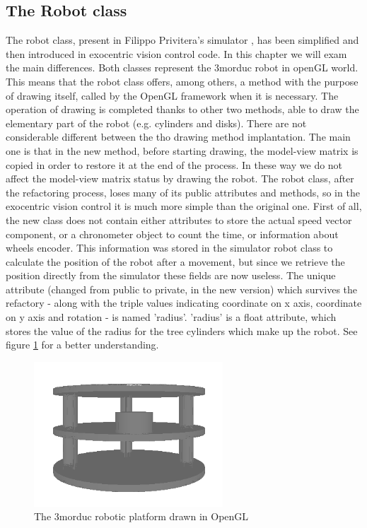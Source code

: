 \subsection{The Robot class}

The robot class, present in Filippo Privitera's simulator \cite{privitera}, has been simplified and then introduced in
exocentric vision control code. In this chapter we will exam the main differences.
\newline Both classes represent the 3morduc robot in openGL world. This means that the robot class offers, among others, a
method with the purpose of drawing itself, called by the OpenGL framework when it is necessary. The operation of drawing is
completed thanks to other two methods, able to draw the elementary part of the robot (e.g. cylinders and disks).
\newline There are not considerable different between the tho drawing method implantation. The main one is that in the new method,
before starting drawing, the model-view matrix is copied in order to restore it at the end of the process. In these way we
do not affect the model-view matrix status by drawing the robot.
\newline The robot class, after the refactoring process, loses many of its public attributes and methods, so in the
exocentric vision control it is much more simple than the original one. First of all, the new class does not contain either
attributes to store the actual speed vector component, or a chronometer object to count the time, or information about wheels
encoder. This information was stored in the simulator robot class to calculate the position of the robot after a movement,
but since we retrieve the position directly from the simulator these fields are now useless. 
\newline The unique attribute (changed from public to private, in the new version) which survives the refactory - along with the
triple values indicating coordinate on x axis, coordinate on y axis and rotation - is named 'radius'. 'radius' is a float
attribute, which stores the value of the radius for the tree cylinders which make up the robot. See figure
\ref{fig:3morduc_opengl} for a better understanding.


\begin{figure}[!h]
  \begin{center}
    \includegraphics[width=200pt]{img/3morduc_opengl}  %
    \caption{The 3morduc robotic platform drawn in OpenGL}
    \label{fig:3morduc_opengl}
  \end{center}
\end{figure}


